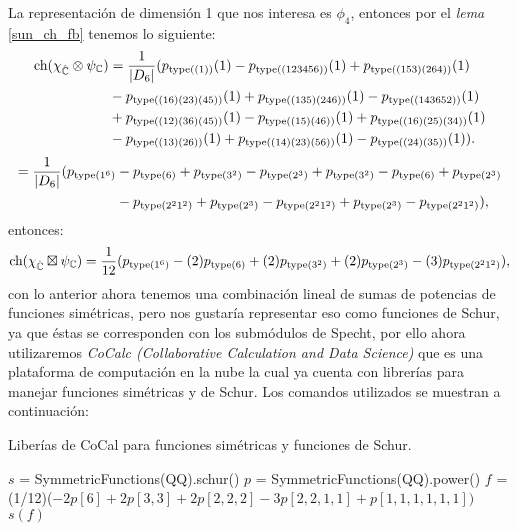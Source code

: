 \documentclass[12pt]{book}
\theoremstyle{definition}
\newcounter{in}
\begin{document}
La representación de dimensión 1 que nos interesa es $\phi_{4}$, entonces por el \textit{lema} \ref{sun_ch_fb} tenemos lo siguiente:
\begin{equation}
\begin{aligned}
\textup{ch}(\chi_{\mathbb{\hat C}} \otimes \psi_{\mathbb{C}}) &=\frac{1}{|D_{6}|}(p_{\textup{type}((1))}(1)-p_{\textup{type}((123456))}(1)+p_{\textup{type}((153)(264))}(1)\\
& -p_{\textup{type}((16)(23)(45))}(1)+p_{\textup{type}((135)(246))}(1) - p_{\textup{type}((143652))}(1) \\
&  + p_{\textup{type}((12)(36)(45))}(1) - p_{\textup{type}((15)(46))}(1) + p_{\textup{type}((16)(25)(34))}(1)  \\
& - p_{\textup{type}((13)(26))}(1) + p_{\textup{type}((14)(23)(56))}(1) - p_{\textup{type}((24)(35))}(1)). 
\end{aligned}
\end{equation}
\begin{equation*}
\begin{aligned}
=\frac{1}{|D_{6}|}(p_{\textup{type}(1^{6})} & -p_{\textup{type}(6)}  +p_{\textup{type}(3^{2})}  -p_{\textup{type}(2^{3})}  +p_{\textup{type}(3^{2})} - p_{\textup{type}(6)} + p_{\textup{type}(2^{3})}  \\
& - p_{\textup{type}(2^{2}1^{2})} + p_{\textup{type}(2^{3})} - p_{\textup{type}(2^{2}1^{2})} + p_{\textup{type}(2^{3})} - p_{\textup{type}(2^{2}1^{2})}), 
\end{aligned}
\end{equation*}
entonces:
\begin{equation*}
\textup{ch}(\chi_{\mathbb{\hat C}} \boxtimes \psi_{\mathbb{C}}) =\frac{1}{12}(p_{\textup{type}(1^{6})}-(2)p_{\textup{type}(6)}  + (2)p_{\textup{type}(3^{2})}  + (2)p_{\textup{type}(2^{3})} - (3)p_{\textup{type}(2^{2}1^{2})}),
\end{equation*}
con lo anterior ahora tenemos una combinación lineal de sumas de potencias de funciones simétricas, pero nos gustaría representar eso como funciones de Schur, ya que éstas se corresponden con los submódulos de Specht, por ello ahora utilizaremos \textit{CoCalc (Collaborative Calculation and Data Science)} que es una plataforma de computación en la nube la cual ya cuenta con librerías para manejar funciones simétricas y de Schur. Los comandos utilizados se muestran a continuación:
\begin{algorithm}[H]
\caption{Liberías de CoCal para funciones simétricas y funciones de Schur.}
\begin{algorithmic}
\STATE $s$ = SymmetricFunctions(QQ).schur()
\STATE $p$ = SymmetricFunctions(QQ).power()
\STATE $f$ = (1/12)($-2p \left [ 6 \right ] +2p \left [ 3,3 \right ]+ 2p \left [ 2,2,2 \right ]- 3p\left [ 2,2,1,1 \right ]+ p \left [ 1,1,1,1,1,1 \right ])$
\PRINT $s(f)$
\end{algorithmic}
\end{algorithm}
\end{document}
